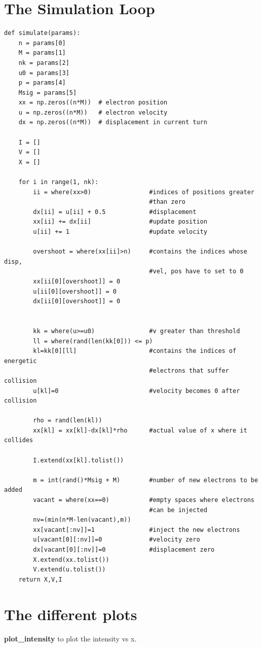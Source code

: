 \documentclass[11pt, a4paper]{article}
\begin{document}
\section{The Simulation Loop}
\begin{verbatim}
def simulate(params):
    n = params[0]
    M = params[1]
    nk = params[2]
    u0 = params[3]
    p = params[4]
    Msig = params[5]
    xx = np.zeros((n*M))  # electron position
    u = np.zeros((n*M))   # electron velocity
    dx = np.zeros((n*M))  # displacement in current turn

    I = []
    V = []
    X = []
    
    for i in range(1, nk):
        ii = where(xx>0)                #indices of positions greater 
                                        #than zero
        dx[ii] = u[ii] + 0.5            #displacement
        xx[ii] += dx[ii]                #update position
        u[ii] += 1                      #update velocity

        overshoot = where(xx[ii]>n)     #contains the indices whose disp, 
                                        #vel, pos have to set to 0
        xx[ii[0][overshoot]] = 0
        u[ii[0][overshoot]] = 0
        dx[ii[0][overshoot]] = 0


        kk = where(u>=u0)               #v greater than threshold
        ll = where(rand(len(kk[0])) <= p)
        kl=kk[0][ll]                    #contains the indices of energetic 
                                        #electrons that suffer collision
        u[kl]=0                         #velocity becomes 0 after collision
        
        rho = rand(len(kl)) 
        xx[kl] = xx[kl]-dx[kl]*rho      #actual value of x where it collides

        I.extend(xx[kl].tolist())

        m = int(rand()*Msig + M)        #number of new electrons to be added
        vacant = where(xx==0)           #empty spaces where electrons 
                                        #can be injected
        nv=(min(n*M-len(vacant),m)) 
        xx[vacant[:nv]]=1               #inject the new electrons
        u[vacant[0][:nv]]=0             #velocity zero
        dx[vacant[0][:nv]]=0            #displacement zero
        X.extend(xx.tolist())
        V.extend(u.tolist())
    return X,V,I
\end{verbatim}
\section{The different plots}
{\bf plot\_intensity} to plot the intensity vs x.
 
\end{document}
